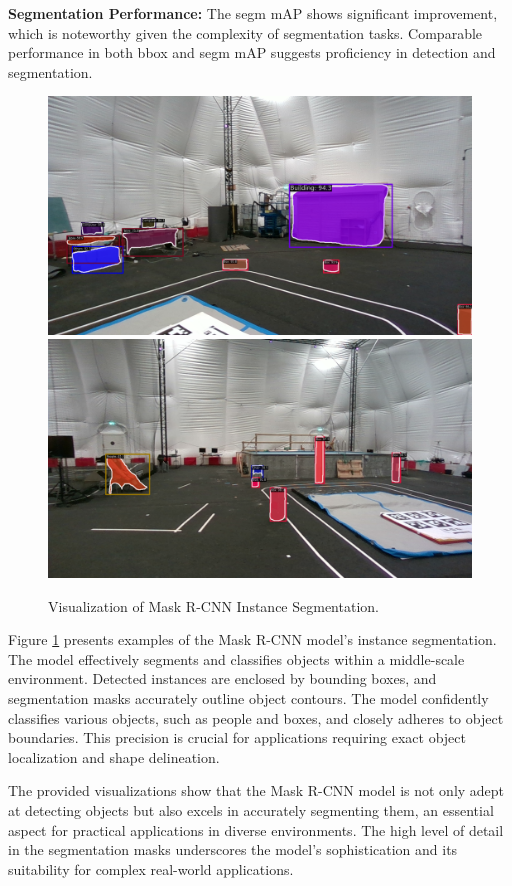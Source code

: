 \textbf{Segmentation Performance:} The segm mAP shows significant improvement, which is noteworthy given the complexity of segmentation tasks. Comparable performance in both bbox and segm mAP suggests proficiency in detection and segmentation.

\begin{figure}[H]
    \centering
    \includegraphics[width=.8\textwidth]{Pictures/maskrcnn/rgb_1701886047.947666.png}
    \includegraphics[width=.8\textwidth]{Pictures/maskrcnn/rgb_1701886140.9438705.png}
    \caption{Visualization of Mask R-CNN Instance Segmentation.}
    \label{fig:seg_pred}
\end{figure}

Figure \ref{fig:seg_pred} presents examples of the Mask R-CNN model's instance segmentation. The model effectively segments and classifies objects within a middle-scale environment. Detected instances are enclosed by bounding boxes, and segmentation masks accurately outline object contours. The model confidently classifies various objects, such as people and boxes, and closely adheres to object boundaries. This precision is crucial for applications requiring exact object localization and shape delineation. 

The provided visualizations show that the Mask R-CNN model is not only adept at detecting objects but also excels in accurately segmenting them, an essential aspect for practical applications in diverse environments. The high level of detail in the segmentation masks underscores the model's sophistication and its suitability for complex real-world applications.


